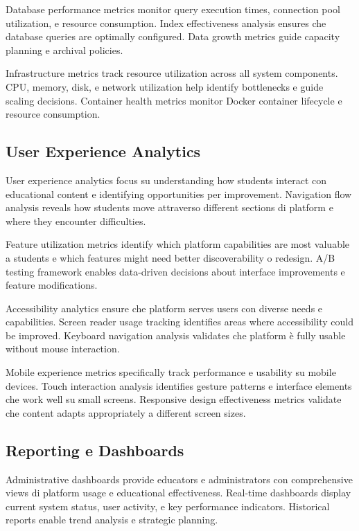 \documentclass[12pt,a4paper]{article}
\begin{document}
Database performance metrics monitor query execution times, connection pool utilization, e resource consumption. Index effectiveness analysis ensures che database queries are optimally configured. Data growth metrics guide capacity planning e archival policies.

Infrastructure metrics track resource utilization across all system components. CPU, memory, disk, e network utilization help identify bottlenecks e guide scaling decisions. Container health metrics monitor Docker container lifecycle e resource consumption.

\subsection{User Experience Analytics}

User experience analytics focus su understanding how students interact con educational content e identifying opportunities per improvement. Navigation flow analysis reveals how students move attraverso different sections di platform e where they encounter difficulties.

Feature utilization metrics identify which platform capabilities are most valuable a students e which features might need better discoverability o redesign. A/B testing framework enables data-driven decisions about interface improvements e feature modifications.

Accessibility analytics ensure che platform serves users con diverse needs e capabilities. Screen reader usage tracking identifies areas where accessibility could be improved. Keyboard navigation analysis validates che platform è fully usable without mouse interaction.

Mobile experience metrics specifically track performance e usability su mobile devices. Touch interaction analysis identifies gesture patterns e interface elements che work well su small screens. Responsive design effectiveness metrics validate che content adapts appropriately a different screen sizes.

\subsection{Reporting e Dashboards}

Administrative dashboards provide educators e administrators con comprehensive views di platform usage e educational effectiveness. Real-time dashboards display current system status, user activity, e key performance indicators. Historical reports enable trend analysis e strategic planning.
\end{document}
